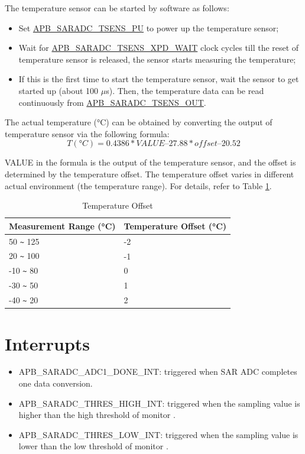 \documentclass[main\_\_EN.tex]{subfiles}
\begin{document}
The temperature sensor can be started by software as follows:
    \begin{itemize}
        \item Set \hyperref[fielddesc:APBSARADCTSENSPU]{APB\_SARADC\_TSENS\_PU} to power up the temperature sensor;

        \item Wait for \hyperref[fielddesc:APBSARADCTSENSXPDWAIT]{APB\_SARADC\_TSENS\_XPD\_WAIT} clock cycles till the reset of temperature sensor is released, the sensor starts measuring the temperature;
        \item If this is the first time to start the temperature sensor, wait the sensor to get started up (about 100 $\mu$s). Then, the temperature data can be read continuously from \hyperref[fielddesc:APBSARADCTSENSOUT]{APB\_SARADC\_TSENS\_OUT}.
    \end{itemize}



The actual temperature (°C) can be obtained by converting the output of temperature sensor via the following formula:
\[
        T(°C) = 0.4386 * VALUE – 27.88 * offset – 20.52
\]

VALUE in the formula is the output of the temperature sensor, and the offset is determined by the temperature offset. The temperature offset varies in different actual environment (the temperature range). For details, refer to Table \ref{tab:tsensor-dac}.

\begin{longtable}[c]{|p{4cm}|p{4cm}|}
    \caption{Temperature Offset}
    \label{tab:tsensor-dac}
    \\\hline
    \rowcolor{lightgray}
    Measurement Range (°C)  & Temperature Offset (°C) \\\hline
    50 \verb+~+ 125 & -2 \\\hline
    20 \verb+~+ 100 & -1 \\\hline
    -10 \verb+~+ 80 & 0 \\\hline
    -30 \verb+~+ 50 & 1 \\\hline
    -40 \verb+~+ 20 & 2 \\\hline
\end{longtable}

\section{Interrupts}

\begin{itemize}
   \item \label{int:SARADCDONEINT1} APB\_SARADC\_ADC1\_DONE\_INT: triggered when SAR ADC completes one data conversion.
   \item \label{int:APBSARADCTHRESxHIGHINT} APB\_SARADC\_THRES\_HIGH\_INT: triggered when the sampling value is higher than the high threshold of monitor .
    \item \label{int:APBSARADCTHRESxLOWINT} APB\_SARADC\_THRES\_LOW\_INT: triggered when the sampling value is lower than the low threshold of monitor .
\end{itemize}
\end{document}
